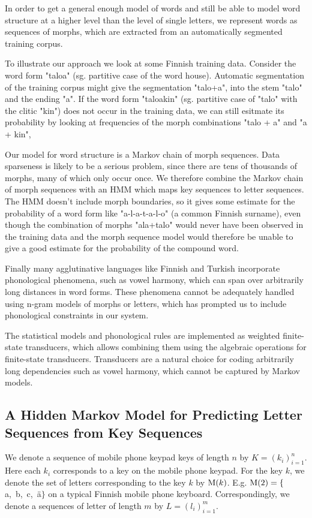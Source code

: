 \documentclass{llncs}
\begin{document}
In order to get a general enough model of words and still be able to
model word structure at a higher level than the level of single
letters, we represent words as sequences of morphs, which are
extracted from an automatically segmented training corpus.

To illustrate our approach we look at some Finnish training
data. Consider the word form "taloa" (sg. partitive case of the word
house). Automatic segmentation of the training corpus might give the
segmentation "talo+a", into the stem "talo" and the ending "a". If the
word form "taloakin" (sg. partitive case of "talo" with the clitic
"kin") does not occur in the training data, we can still esitmate its
probability by looking at frequencies of the morph combinations "talo
+ a" and "a + kin",

Our model for word structure is a Markov chain of morph
sequences. Data sparseness is likely to be a serious problem, since
there are tens of thousands of morphs, many of which only occur
once. We therefore combine the Markov chain of morph sequences with an
HMM which maps key sequences to letter sequences. The HMM doesn't
include morph boundaries, so it gives some estimate for the
probability of a word form like "a-l-a-t-a-l-o" (a common Finnish
surname), even though the combination of morphs "ala+talo" would never
have been observed in the training data and the morph sequence model
would therefore be unable to give a good estimate for the probability
of the compound word.

Finally many agglutinative languages like Finnish and Turkish
incorporate phonological phenomena, such as vowel harmony, which can
span over arbitrarily long distances in word forms. These phenomena
cannot be adequately handled using n-gram models of morphs or letters,
which has prompted us to include phonological constraints in our
system.

The statistical models and phonological rules are implemented as
weighted finite-state transducers, which allows combining them using
the algebraic operations for finite-state transducers. Transducers are
a natural choice for coding arbitrarily long dependencies such as
vowel harmony, which cannot be captured by Markov models.

\subsection{A Hidden Markov Model for Predicting Letter Sequences from Key Sequences}

We denote a sequence of mobile phone keypad keys of length $n$ by $K =
(k_i)_{i=1}^{n}$. Here each $k_i$ corresponds to a key on the mobile
phone keypad. For the key $k$, we denote the set of letters
corresponding to the key $k$ by ${\rm M}(k)$. E.g. ${\rm M}(2) =
\{$a,~b,~c,~\"{a}$\}$ on a typical Finnish mobile phone
keyboard. Correspondingly, we denote a sequences of letter of length
$m$ by $L = (l_i)_{i=1}^{m}$.
\end{document}
